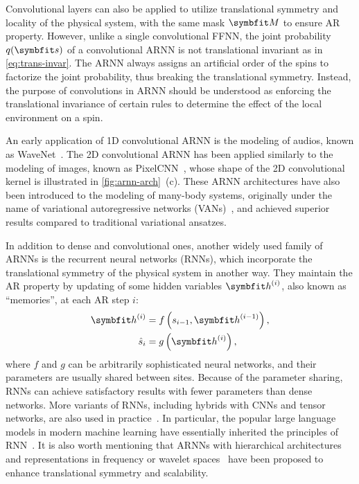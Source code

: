 Convolutional layers can also be applied to utilize translational symmetry and locality of the physical system, with the same mask $\mM$ to ensure AR property. However, unlike a single convolutional FFNN, the joint probability $q(\vs)$ of a convolutional ARNN is not translational invariant as in \cref{eq:trans-invar}. The ARNN always assigns an artificial order of the spins to factorize the joint probability, thus breaking the translational symmetry. Instead, the purpose of convolutions in ARNN should be understood as enforcing the translational invariance of certain rules to determine the effect of the local environment on a spin.

An early application of 1D convolutional ARNN is the modeling of audios, known as WaveNet~\cite{oord2016wavenet}. The 2D convolutional ARNN has been applied similarly to the modeling of images, known as PixelCNN~\cite{oord2016pixel}, whose shape of the 2D convolutional kernel is illustrated in \cref{fig:arnn-arch}~(c). These ARNN architectures have also been introduced to the modeling of many-body systems, originally under the name of variational autoregressive networks (VANs)~\cite{wu2019solving}, and achieved superior results compared to traditional variational ansatzes.

In addition to dense and convolutional ones, another widely used family of ARNNs is the recurrent neural networks (RNNs), which incorporate the translational symmetry of the physical system in another way. They maintain the AR property by updating of some hidden variables $\vh^{(i)}$, also known as ``memories'', at each AR step $i$:
\begin{align}
\vh^{(i)} &= f\left( s_{i - 1}, \vh^{(i - 1)} \right), \label{eq:rnn-update} \\
\hat{s}_i &= g\left( \vh^{(i)} \right), \label{eq:rnn-output}
\end{align}
where $f$ and $g$ can be arbitrarily sophisticated neural networks, and their parameters are usually shared between sites. Because of the parameter sharing, RNNs can achieve satisfactory results with fewer parameters than dense networks. More variants of RNNs, including hybrids with CNNs and tensor networks, are also used in practice~\cite{oord2016pixel, khandoker2023supplementing}. In particular, the popular large language models in modern machine learning have essentially inherited the principles of RNN~\cite{brown2020language}. It is also worth mentioning that ARNNs with hierarchical architectures~\cite{bialas2022hierarchical} and representations in frequency or wavelet spaces~\cite{nash2021generating, mattar2024wavelets} have been proposed to enhance translational symmetry and scalability.

